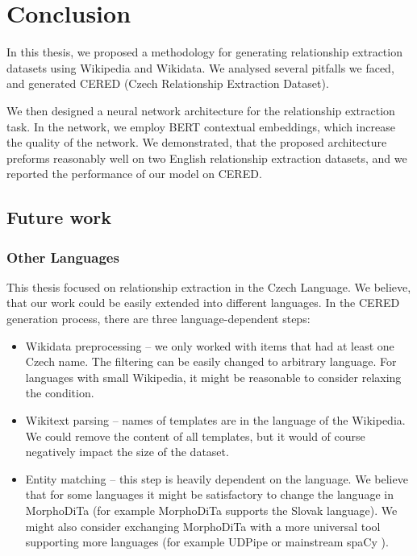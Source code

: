 \chapter*{Conclusion}
In this thesis, we proposed a methodology for generating relationship extraction datasets using Wikipedia and Wikidata. We analysed several pitfalls we faced, and generated CERED (Czech Relationship Extraction Dataset). 

We then designed a neural network architecture for the relationship extraction task. In the network, we employ BERT contextual embeddings, which increase the quality of the network. We demonstrated, that the proposed architecture preforms reasonably well on two English relationship extraction datasets, and we reported the performance of our model on CERED.


\section{Future work}

\subsection{Other Languages}

This thesis focused on relationship extraction in the Czech  Language. We believe, that our work could be easily extended into different languages. In the CERED generation process, there are three language-dependent steps:
\begin{itemize}
\item Wikidata preprocessing -- we only worked with items that had at least one Czech name. The filtering can be easily changed to arbitrary language. For languages with small Wikipedia, it might be reasonable to consider relaxing the condition.
\item Wikitext parsing -- names of templates are in the language of the Wikipedia. We could remove the content of all templates, but it would of course negatively impact the size of the dataset.
\item Entity matching -- this step is heavily dependent on the language. We believe that for some languages it might be satisfactory to change the language in MorphoDiTa (for example MorphoDiTa supports the Slovak language). We might also consider exchanging MorphoDiTa with a more universal tool supporting more languages (for example UDPipe \citep{udpipe:2017} or mainstream spaCy \citep{spacy2}).

\end{itemize}

